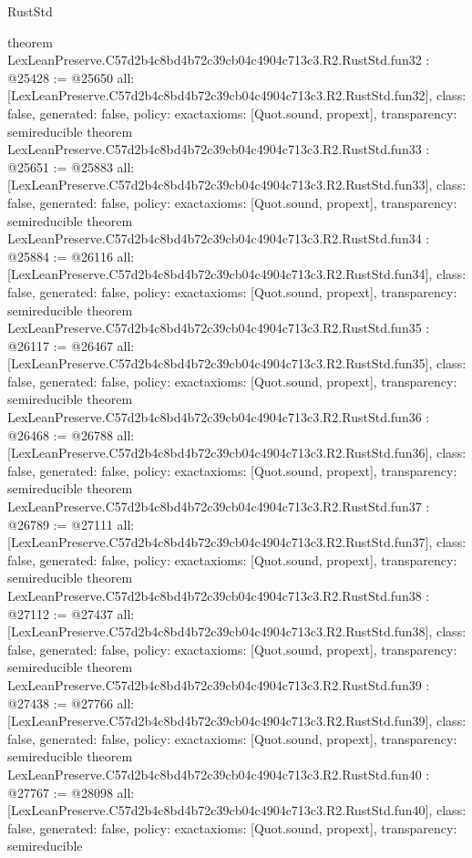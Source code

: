 \begin{lexlean}{RustStd}
\begin{coremodule}
{}
theorem LexLeanPreserve.C57d2b4c8bd4b72c39cb04c4904c713c3.R2.RustStd.fun32 : @25428 := @25650 {
  all: [LexLeanPreserve.C57d2b4c8bd4b72c39cb04c4904c713c3.R2.RustStd.fun32],
  class: false,
  generated: false,
  policy: exact{axioms: [Quot.sound, propext]},
  transparency: semireducible
}
theorem LexLeanPreserve.C57d2b4c8bd4b72c39cb04c4904c713c3.R2.RustStd.fun33 : @25651 := @25883 {
  all: [LexLeanPreserve.C57d2b4c8bd4b72c39cb04c4904c713c3.R2.RustStd.fun33],
  class: false,
  generated: false,
  policy: exact{axioms: [Quot.sound, propext]},
  transparency: semireducible
}
theorem LexLeanPreserve.C57d2b4c8bd4b72c39cb04c4904c713c3.R2.RustStd.fun34 : @25884 := @26116 {
  all: [LexLeanPreserve.C57d2b4c8bd4b72c39cb04c4904c713c3.R2.RustStd.fun34],
  class: false,
  generated: false,
  policy: exact{axioms: [Quot.sound, propext]},
  transparency: semireducible
}
theorem LexLeanPreserve.C57d2b4c8bd4b72c39cb04c4904c713c3.R2.RustStd.fun35 : @26117 := @26467 {
  all: [LexLeanPreserve.C57d2b4c8bd4b72c39cb04c4904c713c3.R2.RustStd.fun35],
  class: false,
  generated: false,
  policy: exact{axioms: [Quot.sound, propext]},
  transparency: semireducible
}
theorem LexLeanPreserve.C57d2b4c8bd4b72c39cb04c4904c713c3.R2.RustStd.fun36 : @26468 := @26788 {
  all: [LexLeanPreserve.C57d2b4c8bd4b72c39cb04c4904c713c3.R2.RustStd.fun36],
  class: false,
  generated: false,
  policy: exact{axioms: [Quot.sound, propext]},
  transparency: semireducible
}
theorem LexLeanPreserve.C57d2b4c8bd4b72c39cb04c4904c713c3.R2.RustStd.fun37 : @26789 := @27111 {
  all: [LexLeanPreserve.C57d2b4c8bd4b72c39cb04c4904c713c3.R2.RustStd.fun37],
  class: false,
  generated: false,
  policy: exact{axioms: [Quot.sound, propext]},
  transparency: semireducible
}
theorem LexLeanPreserve.C57d2b4c8bd4b72c39cb04c4904c713c3.R2.RustStd.fun38 : @27112 := @27437 {
  all: [LexLeanPreserve.C57d2b4c8bd4b72c39cb04c4904c713c3.R2.RustStd.fun38],
  class: false,
  generated: false,
  policy: exact{axioms: [Quot.sound, propext]},
  transparency: semireducible
}
theorem LexLeanPreserve.C57d2b4c8bd4b72c39cb04c4904c713c3.R2.RustStd.fun39 : @27438 := @27766 {
  all: [LexLeanPreserve.C57d2b4c8bd4b72c39cb04c4904c713c3.R2.RustStd.fun39],
  class: false,
  generated: false,
  policy: exact{axioms: [Quot.sound, propext]},
  transparency: semireducible
}
theorem LexLeanPreserve.C57d2b4c8bd4b72c39cb04c4904c713c3.R2.RustStd.fun40 : @27767 := @28098 {
  all: [LexLeanPreserve.C57d2b4c8bd4b72c39cb04c4904c713c3.R2.RustStd.fun40],
  class: false,
  generated: false,
  policy: exact{axioms: [Quot.sound, propext]},
  transparency: semireducible
}
\end{coremodule}
\end{lexlean}
